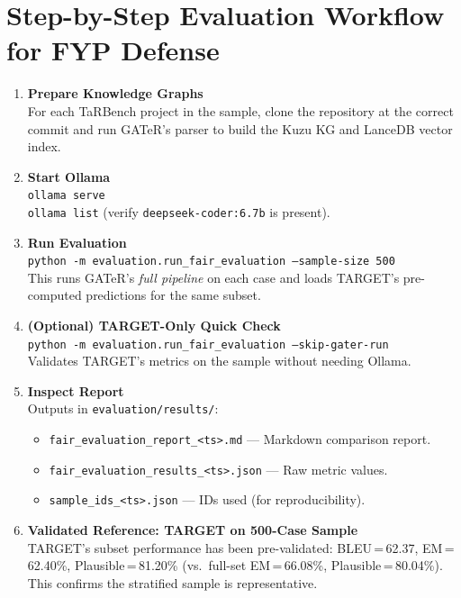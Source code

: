 \documentclass[11pt,a4paper]{article}
\begin{document}
\section{Step-by-Step Evaluation Workflow for FYP Defense}
\label{sec:workflow}

\begin{enumerate}[label=\textbf{Step \arabic*:},leftmargin=3.5em]
    \item \textbf{Prepare Knowledge Graphs} \\
          For each TaRBench project in the sample, clone the repository
          at the correct commit and run GATeR's parser to build the Kuzu
          KG and LanceDB vector index.

    \item \textbf{Start Ollama} \\
          \texttt{ollama serve} \\
          \texttt{ollama list} (verify \texttt{deepseek-coder:6.7b}
          is present).

    \item \textbf{Run Evaluation} \\
          \texttt{python -m evaluation.run\_fair\_evaluation --sample-size 500}\\
          This runs GATeR's \emph{full pipeline} on each case and loads
          TARGET's pre-computed predictions for the same subset.

    \item \textbf{(Optional) TARGET-Only Quick Check} \\
          \texttt{python -m evaluation.run\_fair\_evaluation --skip-gater-run}\\
          Validates TARGET's metrics on the sample without needing Ollama.

    \item \textbf{Inspect Report} \\
          Outputs in \texttt{evaluation/results/}:
          \begin{itemize}
              \item \texttt{fair\_evaluation\_report\_<ts>.md} ---
                    Markdown comparison report.
              \item \texttt{fair\_evaluation\_results\_<ts>.json} ---
                    Raw metric values.
              \item \texttt{sample\_ids\_<ts>.json} ---
                    IDs used (for reproducibility).
          \end{itemize}

    \item \textbf{Validated Reference: TARGET on 500-Case Sample} \\
          TARGET's subset performance has been pre-validated:
          BLEU\,=\,62.37, EM\,=\,62.40\%, Plausible\,=\,81.20\%
          (vs.\ full-set EM\,=\,66.08\%, Plausible\,=\,80.04\%).
          This confirms the stratified sample is representative.
\end{enumerate}
\end{document}
